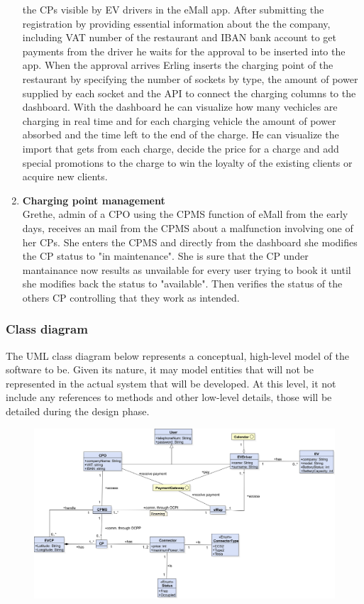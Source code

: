 \begin{enumerate}[label=\textbf{\Alph*}.]
            the CPs visible by EV drivers in the eMall app. After submitting the registration by providing essential information about the the company, including
            VAT number of the restaurant and IBAN bank account to get payments from the driver he waits for the approval to be inserted into the app.
            When the approval arrives Erling inserts the charging point of the restaurant by specifying the number of sockets by type, the amount of power supplied by
            each socket and the API to connect the charging columns to the dashboard. With the dashboard he can visualize how many vechicles are charging in real time
            and for each charging vehicle the amount of power absorbed and the time left to the end of the charge. He can visualize the import that gets from each
            charge, decide the price for a charge and add special promotions to the charge to win the loyalty of the existing clients or acquire new clients.
      \item \textbf{Charging point management} \\
            Grethe, admin of a CPO using the CPMS function of eMall from the early days, receives an mail from the CPMS about a malfunction involving one of her CPs.
            She enters the CPMS and directly from the dashboard she modifies the CP status to "in maintenance".
            She is sure that the CP under mantainance now results as unvailable for every user trying to book it until she modifies back the status to "available".
            Then verifies the status of the others CP controlling that they work as intended.
\end{enumerate}

\subsubsection{Class diagram}
The UML class diagram below represents a conceptual, high-level model of
the software to be. Given its nature, it may model entities that will not
be represented in the actual system that will be developed. At this
level, it not include any references to methods and other low-level
details, those will be detailed during the design phase.
\begin{figure}[H]
      \centering
      \includegraphics[scale=0.4]{src/domain_UML.png}
\end{figure} \vspace{1cm}

